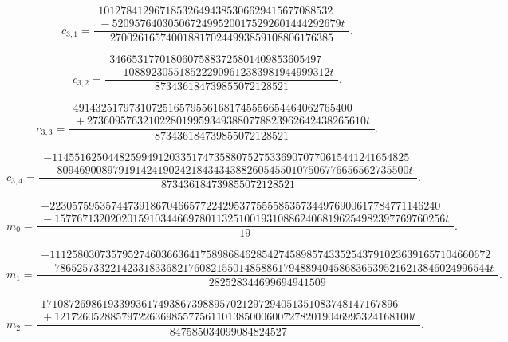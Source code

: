 \[
c_{3,1}=\frac{\begin{gathered}\scriptstyle 101278412967185326494385306629415677088532\\[-2pt]\scriptstyle {}-52095764030506724995200175292601444292679t\end{gathered}}{2700261657400188170244993859108806176385}.
\tag{A.154.D31}
\]

\[
c_{3,2}=\frac{\begin{gathered}\scriptstyle 34665317701806075883725801409853605497\\[-2pt]\scriptstyle {}-1088923055185222909612383981944999312t\end{gathered}}{873436184739855072128521}.
\tag{A.154.D32}
\]

\[
c_{3,3}=\frac{\begin{gathered}\scriptstyle 49143251797310725165795561681745556654464062765400\\[-2pt]\scriptstyle {}+27360957632102280199593493880778823962642438265610t\end{gathered}}{873436184739855072128521}.
\tag{A.154.D33}
\]

\[
c_{3,4}=\frac{\begin{gathered}\scriptstyle -1145516250448259949120335174735880752753369070770615441241654825\\[-2pt]\scriptstyle {}-809469008979191424190242184343438826054550107506776656562735500t\end{gathered}}{873436184739855072128521}.
\tag{A.154.D34}
\]

\[
m_0=\frac{\begin{gathered}\scriptstyle -2230575953574473918670466577224295377555585357344976900617784771146240\\[-2pt]\scriptstyle {}-1577671320202015910344669780113251001931088624068196254982397769760256t\end{gathered}}{19}.
\tag{A.154.Dm0}
\]

\[
m_1=\frac{\begin{gathered}\scriptstyle -1112580307357952746036636417589868462854274589857433525437910236391657104660672\\[-2pt]\scriptstyle {}-786525733221423318336821760821550148588617948894045868365395216213846024996544t\end{gathered}}{282528344699694941509}.
\tag{A.154.Dm1}
\]

\[
m_2=\frac{\begin{gathered}\scriptstyle 1710872698619339936174938673988957021297294051351083748147167896\\[-2pt]\scriptstyle {}+1217260528857972263698557756110138500060072782019046995324168100t\end{gathered}}{847585034099084824527}.
\tag{A.154.Dm2}
\]
